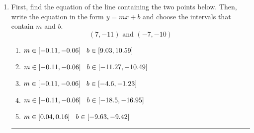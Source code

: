 \documentclass[14pt]{extbook}
\newcommand{\litem}[1]{\item#1\hspace*{-1cm}\rule{\textwidth}{0.4pt}}
\begin{document}
\begin{enumerate}
{\begin{enumerate}[label=\Alph*.]
\end{enumerate} }
\litem{
First, find the equation of the line containing the two points below. Then, write the equation in the form $ y=mx+b $ and choose the intervals that contain $m$ and $b$.\[ (7, -11) \text{ and } (-7, -10) \]\begin{enumerate}[label=\Alph*.]
\item \( m \in [-0.11, -0.06] \hspace*{3mm} b \in [9.03, 10.59] \)
\item \( m \in [-0.11, -0.06] \hspace*{3mm} b \in [-11.27, -10.49] \)
\item \( m \in [-0.11, -0.06] \hspace*{3mm} b \in [-4.6, -1.23] \)
\item \( m \in [-0.11, -0.06] \hspace*{3mm} b \in [-18.5, -16.95] \)
\item \( m \in [0.04, 0.16] \hspace*{3mm} b \in [-9.63, -9.42] \)

\end{enumerate} }
\end{enumerate}
\end{document}

